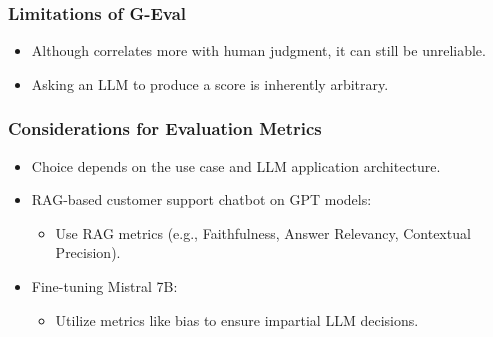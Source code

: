 \begin{frame}[fragile]\frametitle{Limitations of G-Eval}
  \begin{itemize}
    \item Although correlates more with human judgment, it can still be unreliable.
    \item Asking an LLM to produce a score is inherently arbitrary.
  \end{itemize}
\end{frame}


\begin{frame}[fragile]\frametitle{Considerations for Evaluation Metrics}
  \begin{itemize}
    \item Choice depends on the use case and LLM application architecture.
    \item RAG-based customer support chatbot on GPT models:
      \begin{itemize}
        \item Use RAG metrics (e.g., Faithfulness, Answer Relevancy, Contextual Precision).
      \end{itemize}
    \item Fine-tuning Mistral 7B:
      \begin{itemize}
        \item Utilize metrics like bias to ensure impartial LLM decisions.
      \end{itemize}
  \end{itemize}
\end{frame}


